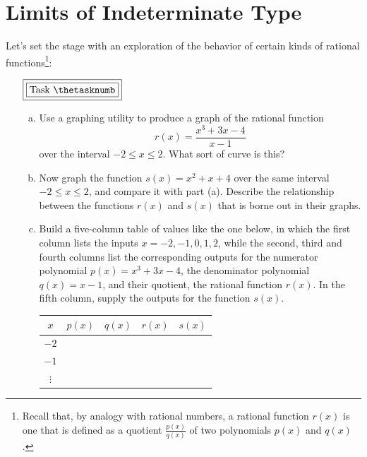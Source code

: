 \documentclass[11pt]{article}
\newcounter{tasknumb}
\newcommand{\tasknumb}[1]{\refstepcounter{tasknumb}\textmd{\textbf{$\fbox{$\fbox{Task \thetasknumb}$}$}}#1}
\newenvironment{task}[1][]%
 {\begin{itemize}
 \item[\tasknumb{#1}] }
{
    \end{itemize}    }%
\begin{document}
\newpage
\section{Limits of Indeterminate Type}

Let's set the stage with an exploration of the behavior of certain kinds of rational functions\footnote{Recall that, by analogy with rational numbers, a rational function $r(x)$ is one that is defined as a quotient $\frac{p(x)}{q(x)}$ of two polynomials $p(x)$ and $q(x)$.}:

\begin{task}[\label{factorable}]
\begin{enumerate}[(a)] \itemsep -8pt
\item Use a graphing utility to produce a graph of the rational function $$r(x)=\frac{x^3+3x-4}{x-1}$$over the interval $-2 \le x \le 2$. What sort of curve is this? \\
\item Now graph the function $s(x)=x^2+x+4$ over the same interval $-2 \le x \le 2$, and compare it with part (a). Describe the relationship between the functions $r(x)$ and $s(x)$ that is borne out in their graphs. \\
\item Build a five-column table of values like the one below, in which the first column lists the inputs $x=-2, -1, 0, 1, 2$, while the second, third and fourth columns list the corresponding outputs for the numerator polynomial $p(x)=x^3+3x-4$, the denominator polynomial $q(x)=x-1$, and their quotient, the rational function $r(x)$. %
In the fifth column, supply the outputs for the function $s(x)$. 

\begin{center}
\begin{tabularx}{0.75\textwidth}{c|CCC|C}
$x$ & $p(x)$ & $q(x)$ & $r(x)$ & $s(x)$ \\ \hline
$-2$ &&&& \\
$-1$ &&&& \\
$\vdots$ &&&&
\end{tabularx}
\end{center}
\bigskip


\end{enumerate}
\end{task}
\end{document}
